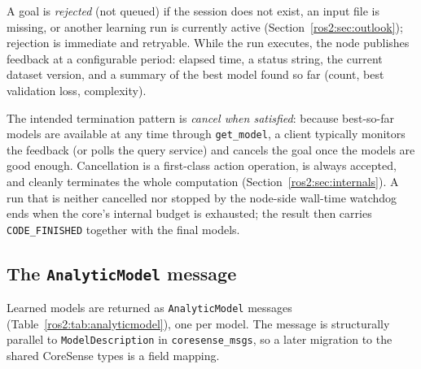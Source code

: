 A goal is \emph{rejected} (not queued) if the session does not exist, an
input file is missing, or another learning run is currently active
(Section~\ref{ros2:sec:outlook}); rejection is immediate and retryable.
While the run executes, the node publishes feedback at a configurable period:
elapsed time, a status string, the current dataset version, and a summary of
the best model found so far (count, best validation loss, complexity).

The intended termination pattern is \emph{cancel when satisfied}: because
best-so-far models are available at any time through \texttt{get\_model},
a client typically monitors the feedback (or polls the query service) and
cancels the goal once the models are good enough. Cancellation is a
first-class action operation, is always accepted, and cleanly terminates the
whole computation (Section~\ref{ros2:sec:internals}). A run that is neither
cancelled nor stopped by the node-side wall-time watchdog ends when the
core's internal budget is exhausted; the result then carries
\texttt{CODE\_FINISHED} together with the final models.

\subsection{The \texttt{AnalyticModel} message}
\label{ros2:sec:analyticmodel}

Learned models are returned as \texttt{AnalyticModel} messages
(Table~\ref{ros2:tab:analyticmodel}), one per model. The message is
structurally parallel to \texttt{ModelDescription} in \texttt{coresense\_msgs},
so a later migration to the shared CoreSense types is a field mapping.

